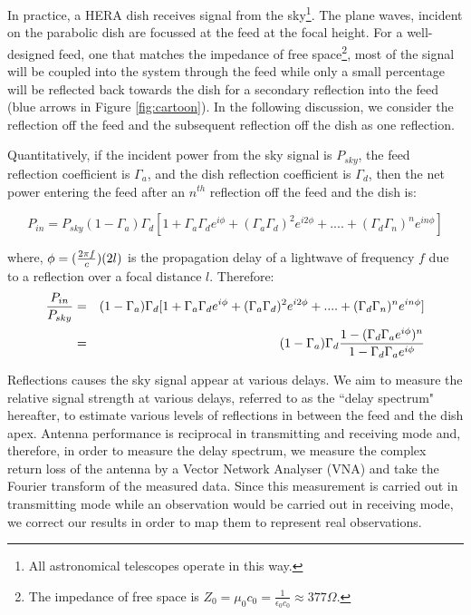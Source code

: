 \documentclass[12pt,preprint]{aastex}
\begin{document}
In practice, a HERA dish receives signal from the sky\footnote{All astronomical
telescopes operate in this way.}. The plane waves, incident on the parabolic dish are focussed at the feed at the focal
height. For a well-designed feed, one that matches the impedance of
free space\footnote{The impedance of free space is $Z_{0} = \mu_{0}c_{0} =
\frac{1}{\epsilon_{0}c_{0}} \approx 377\Omega $.}, most of the signal will be
coupled into the system through the feed while only a small percentage will be reflected
back towards the dish for a secondary reflection into the feed (blue arrows in
Figure \ref{fig:cartoon}).  
 In the following discussion, we consider the reflection
off the feed and the subsequent reflection off the dish as one reflection.

Quantitatively, if the incident power from the sky signal is $P_{sky}$, the feed
reflection coefficient is $\Gamma_{a}$, and the dish reflection
coefficient is $\Gamma_{d}$, then the net power entering the feed after an
$n^{th}$ reflection off the feed and the dish is:

\begin{equation}
P_{in} =  P_{sky}(1-\Gamma_{a})\Gamma_{d} [1+ \Gamma_{a}\Gamma_{d} e^{i\phi}+ (\Gamma_{a}\Gamma_{d})^2e^{i2\phi}+ ....+ (\Gamma_{d}\Gamma_{n})^{n}e^{in\phi}]
\end{equation}

where, $\phi = ({2\pi f \over c})(2l)$ is the propagation delay of a lightwave of frequency $f$ due to a reflection over a focal distance $l$. 
Therefore:
\begin{eqnarray}
{P_{in} \over P_{sky} } & = & (1-\Gamma_{a})\Gamma_{d} [1+ \Gamma_{a}\Gamma_{d} e^{i\phi}+ (\Gamma_{a}\Gamma_{d})^2e^{i2\phi}+ ....+ (\Gamma_{d}\Gamma_{n})^{n}e^{in\phi}] \nonumber\\
      & = & (1-\Gamma_{a})\Gamma_{d} {1-(\Gamma_{d}\Gamma_{a}e^{i\phi})^{n} \over 1-\Gamma_{d} \Gamma_{a} e^{i\phi} } 
\end{eqnarray}

Reflections causes the sky signal appear at various delays. We aim to measure the relative signal strength at various
delays, referred to as the ``delay spectrum" hereafter, to estimate various
levels of reflections in between the feed and the dish apex. Antenna performance is reciprocal in transmitting and receiving mode and, therefore, in order to measure the delay spectrum, we measure the complex return loss of the antenna by a Vector Network Analyser (VNA) and take the Fourier transform of the measured data. 
Since this measurement is carried out in
transmitting mode while an observation would be carried out in receiving mode,
we correct our results in order to map them to represent real observations.
\end{document}
